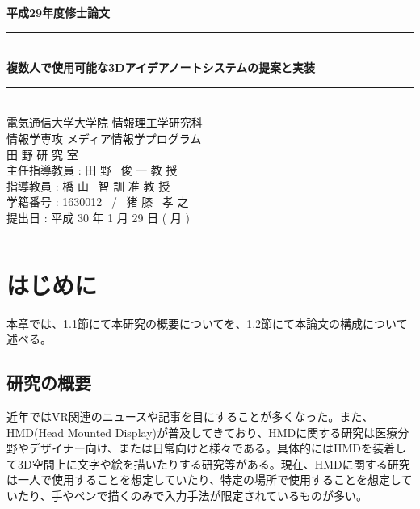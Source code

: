 \documentclass[11pt,a4j, titlepage]{jarticle} %
\begin{document}
\begin{titlepage}
	\begin{center}
		\vspace{8ex}
		{\Large \bf 平成29年度修士論文}
		\vspace{3ex}\\
		\rule{\hsize}{2mm}
		\vspace{1mm}\\ 
		{\LARGE \bf 複数人で使用可能な3Dアイデアノートシステムの提案と実装} 
		\vspace{6mm}\\ 
		\rule{\hsize}{2mm} 
		\vspace{2.5cm} \\ 
		{\Large 電気通信大学大学院 情報理工学研究科 \\ 
		情報学専攻 メディア情報学プログラム} 
		\vspace{2ex} \\ 
		\renewcommand{\thefootnote}{\fnsymbol{footnote}} 
		{\Large 田 野 研 究 室} 
		\vspace{3ex} \\ 
		{\Large 主任指導教員 : 田 野 \ 俊 一    教 授} 
		\vspace{3ex} \\
                {\Large 指導教員 : 橋 山 \ 智 訓    准 教 授} 
		\vspace{3ex} \\
		{\Large 学籍番号 : 1630012 \ / \ 猪 膝 \ 孝 之} 
		\vspace{5ex} \\ 
		{\Large 提出日 : 平成 30 年 1 月 29 日 ( 月 )} 
		\vspace{-5ex} \\ 
		\begin{verbatim} 
		\end{verbatim} 
	\end{center} 
\end{titlepage}

\tableofcontents
\newpage
\listoffigures
\newpage
\listoftables
\newpage
\section{はじめに}
本章では、1.1節にて本研究の概要についてを、1.2節にて本論文の構成について述べる。

\subsection{研究の概要}
近年ではVR関連のニュースや記事を目にすることが多くなった。また、HMD(Head Mounted Display)が普及してきており、HMDに関する研究は医療分野やデザイナー向け、または日常向けと様々である。具体的にはHMDを装着して3D空間上に文字や絵を描いたりする研究等がある。現在、HMDに関する研究は一人で使用することを想定していたり、特定の場所で使用することを想定していたり、手やペンで描くのみで入力手法が限定されているものが多い。
\end{document}
